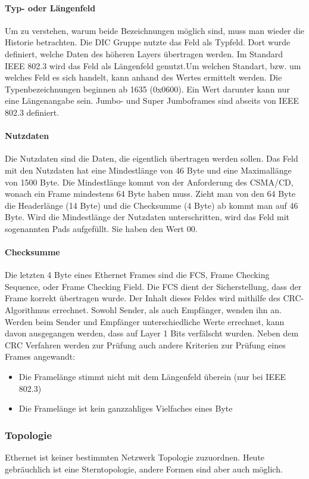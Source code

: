 \documentclass[12pt, a4paper, ngerman]{article}
\newcommand{\fcs}{FCS, Frame Checking Sequence,\xspace}
\begin{document}
\paragraph{Typ- oder Längenfeld}
Um zu verstehen, warum beide Bezeichnungen möglich sind, muss man wieder die Historie betrachten. Die DIC Gruppe nutzte das Feld als Typfeld. Dort wurde definiert, welche Daten des höheren Layers übertragen werden.  Im Standard IEEE 802.3 wird das Feld als Längenfeld genutzt.Um welchen Standart, bzw. um welches Feld es sich handelt, kann anhand des Wertes ermittelt werden. Die Typenbezeichnungen beginnen ab 1635 (0x0600). Ein Wert darunter kann nur eine Längenangabe sein. Jumbo- und Super Jumboframes sind abseits von IEEE 802.3 definiert.

\paragraph{Nutzdaten}
Die Nutzdaten sind die Daten, die eigentlich übertragen werden sollen. Das Feld mit den Nutzdaten hat eine Mindestlänge von 46 Byte  und eine Maximallänge von 1500 Byte. Die Mindestlänge kommt von der Anforderung des \mbox{CSMA/CD}, wonach ein Frame mindestens 64 Byte haben muss. Zieht man von den 64 Byte die Headerlänge (14 Byte) und die Checksumme (4 Byte) ab kommt man auf 46 Byte. Wird die Mindestlänge der Nutzdaten unterschritten, wird das Feld mit sogenannten Pads aufgefüllt. Sie haben den Wert 00.
\paragraph{Checksumme \label{checksumme}}
Die letzten 4 Byte eines Ethernet Frames sind die \fcs oder Frame Checking Field. Die FCS dient der Sicherstellung, dass der Frame korrekt übertragen wurde. Der Inhalt dieses Feldes wird mithilfe des CRC-Algorithmus errechnet. Sowohl Sender, als auch Empfänger, wenden ihn an. Werden beim Sender und Empfänger unterschiedliche Werte errechnet, kann davon ausgegangen werden, dass auf Layer 1 Bits verfälscht wurden. Neben dem CRC Verfahren werden zur Prüfung auch andere Kriterien zur Prüfung eines Frames angewandt:
\begin{itemize}
	\item Die Framelänge stimmt nicht mit dem Längenfeld überein (nur bei IEEE 802.3)
	\item Die Framelänge ist kein ganzzahliges Vielfaches eines Byte
\end{itemize}


\subsubsection{Topologie}
Ethernet ist keiner bestimmten Netzwerk Topologie zuzuordnen. Heute gebräuchlich ist eine Sterntopologie, andere Formen sind aber auch möglich.   
\end{document}
